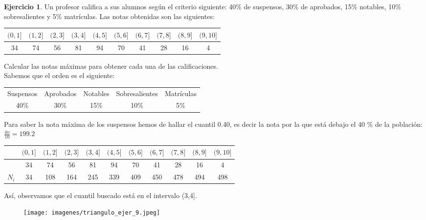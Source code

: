 \documentclass[a4paper, 12pt]{article}
\theoremstyle{definition}
\newtheorem{ej}{Ejercicio}
\begin{document}
\begin{ej}
Un profesor califica a sus alumnos según el criterio siguiente: 40\% de suspensos, 30\% de aprobados, 15\% notables, 10\% sobresalientes y 5\% matrículas. Las notas obtenidas son las siguientes:

\begin{center}
\begin{tabular}{|c|c|c|c|c|c|c|c|c|c|}
\hline
     \((0,1]\) & \((1,2]\) & \((2,3]\) & \((3,4]\) & \((4,5]\) & \((5,6]\) & \((6,7]\) & \((7,8]\) & \((8,9]\) & \((9,10]\) \\
     \hline
     34 & 74 & 56 & 81 & 94 & 70 & 41 & 28 & 16 & 4 \\
     \hline
\end{tabular}
\end{center}

Calcular las notas máximas para obtener cada una de las calificaciones. \\

Sabemos que el orden es el siguiente:

\begin{center}
    \begin{tabular}{c c c c c}
         Suspensos & Aprobados & Notables & Sobresalientes & Matrículas  \\
         40\% & 30\% & 15\% & 10\% & 5\% 
    \end{tabular}
\end{center}

Para saber la nota máxima de los suspensos hemos de hallar el cuantil 0.40, es decir la nota por la que está debajo el 40 \% de la población: \(\frac{4n}{10} = 199.2\)

\begin{center}
\begin{tabular}{|c|c|c|c|c|c|c|c|c|c|c|}
\hline
     & \((0,1]\) & \((1,2]\) & \((2,3]\) & \((3,4]\) & \((4,5]\) & \((5,6]\) & \((6,7]\) & \((7,8]\) & \((8,9]\) & \((9,10]\) \\
     \hline
     & 34 & 74 & 56 & 81 & 94 & 70 & 41 & 28 & 16 & 4 \\
     \hline
     \(N_i\) & 34 & 108 & 164 & 245 & 339 & 409 & 450 & 478 & 494 & 498 \\
     \hline
\end{tabular}
\end{center}

Así, observamos que el cuantil buscado está en el intervalo (3,4].

\begin{figure}[h!]
    \centering
    \texttt{[image: imagenes/triangulo\_ejer\_9.jpeg]}
\end{figure}


\end{ej}
\end{document}
